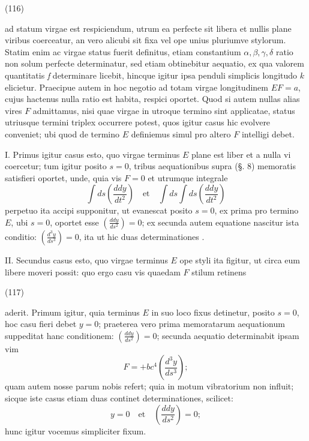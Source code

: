 \documentclass[11pt,a4paper]{article}
\begin{document}
(116)

ad statum virgae est respiciendum, utrum ea perfecte sit libera et nullis
plane viribus coerceatur, an vero alicubi sit fixa vel ope unius pluriumve
stylorum. Statim enim ac virgae status fuerit definitus, etiam constantium
$\alpha, \beta, \gamma, \delta$ ratio non solum perfecte determinatur, sed
etiam obtinebitur aequatio, ex qua valorem quantitatis \emph{f} determinare
licebit, hincque igitur ipsa penduli simplicis longitudo $k$ elicietur.
Praecipue autem in hoc negotio ad totam virgae longitudinem $EF = a$, cujus
hactenus nulla ratio est habita, respici oportet. Quod si autem nullas alias
vires $F$ admittamus, nisi quae virgae in utroque termino sint applicatae,
status utriusque termini triplex occurrere potest, quos igitur casus hic
evolvere conveniet; ubi quod de termino $E$ definiemus simul pro altero $F$
intelligi debet.

I. Primus igitur casus esto, quo virgae terminus $E$ plane est liber et a
nulla vi coercetur; tum igitur posito $s = 0$, tribus aequationibus supra
(§. 8) memoratis satisfieri oportet, unde, quia vis $F = 0$ et utrumque
integrale
\[
\int ds \left(\frac{ddy}{dt^2}\right) \quad\text{et}\quad \int ds \int ds \left(\frac{ddy}{dt^2}\right)
\]
perpetuo ita accipi supponitur, ut evanescat posito $s = 0$, ex prima pro
termino $E$, ubi $s = 0$, oportet esse $\left(\frac{ddy}{ds^2}\right) = 0$; ex
secunda autem equatione nascitur ista conditio:
$\left(\frac{d^3y}{ds^3}\right) = 0$, ita ut hic duas determinationes
.

II. Secundus casus esto, quo virgae terminus $E$ ope styli ita figitur, ut
circa eum libere moveri possit: quo ergo casu vis quaedam $F$ stilum retinens

(117)

aderit. Primum igitur, quia terminus $E$ in suo loco fixus detinetur, posito
$s = 0$, hoc casu fieri debet $y = 0$; praeterea vero prima memoratarum
aequationum suppeditat hanc conditionem: $\left(\frac{ddy}{ds^2}\right) = 0$;
secunda aequatio determinabit ipsam vim
\[
F = +bc^4\left(\frac{d^3y}{ds^3}\right);
\]
quam autem nosse parum nobis refert; quia in motum vibratorium non influit;
sicque iste casus etiam duas continet determinationes, scilicet:
\[
y = 0 \quad\text{et}\quad \left(\frac{ddy}{ds^2}\right) = 0;
\]
hunc igitur vocemus simpliciter fixum.
\end{document}
